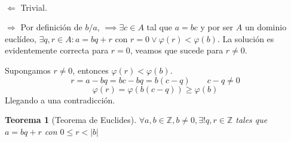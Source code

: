 \documentclass[11pt, a4paper, titlepage]{article}
\makeatletter
\newif\IfInSansMode
\let\oldsf\sffamily
\renewcommand*{\sffamily}{\oldsf\mathversion{sans}\InSansModetrue}
\let\oldnorm\normalfont
\renewcommand*{\normalfont}{\oldnorm\InSansModefalse\mathversion{normal}}
\renewenvironment{proof}[1][\proofname] {\vspace{-15pt}\par\pushQED{\qed}\normalfont\topsep6\p@\@plus6\p@\relax\trivlist\item[\hskip\labelsep\it#1\@addpunct{.}]\ignorespaces}{\popQED\endtrivlist\@endpefalse}
\providecommand{\ent}{\mathbb{Z}}
\renewenvironment{proof}[1][\proofname] {\par\pushQED{\qed}\normalfont\topsep6\p@\@plus6\p@\relax\trivlist\item[\hskip\labelsep\itshape\sffamily#1\@addpunct{.}]\ignorespaces}{\popQED\endtrivlist\@endpefalse}
\theoremstyle{theorem-style}
\newtheorem{nth}{Teorema}[section]
\theoremstyle{definition-style}
\theoremstyle{remark-style}
\theoremstyle{example-style}
\makeatother
\begin{document}
\begin{proof}\hfill\\

    $\boxed{\Longleftarrow}$ Trivial.

  $\boxed{\Longrightarrow}$ Por definición de $b/a$, $\implies \exists c \in A$ tal que $a=bc$ y por ser $A$ un dominio euclídeo, $\exists q,r \in A : a = bq + r $
  con $r=0 \vee \varphi(r) < \varphi(b)$. La solución 	es evidentemente correcta para $r = 0$, veamos que sucede para $r \neq 	0$.

    Supongamos $r \neq 0$, entonces $\varphi(r) < \varphi(b)$.
    $$r = a - bq = bc - bq = b(c-q) \quad \quad c-q \neq 0$$
    $$\varphi(r) = \varphi(b(c-q)) \ge \varphi(b)$$
    Llegando a una contradicción.

\end{proof}

\begin{nth}[Teorema de Euclides]

	$\forall a,b \in \ent, b \neq 0, \exists !q,r \in \ent$ tales que $a = bq + r $ con $0 \le r < |b|$
\end{nth}
\end{document}
